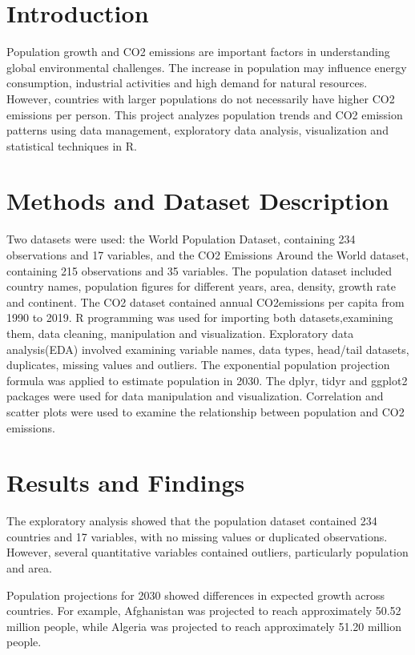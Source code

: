\documentclass[10pt,a4paper]{article}
\begin{document}
\section{Introduction}

Population growth and CO2 emissions are important factors in understanding global environmental challenges. The increase in population may influence energy consumption, industrial activities and high demand for natural resources. However, countries with larger populations do not necessarily have higher CO2 emissions per person. This project analyzes population trends and CO2 emission patterns using data management, exploratory data analysis, visualization and statistical techniques in R.


\section{Methods and Dataset Description}

Two datasets were used: the World Population Dataset, containing 234 observations and 17 variables, and the CO2 Emissions Around the World dataset, containing 215 observations and 35 variables. The population dataset included country names, population figures for different years, area, density, growth rate and continent. The CO2 dataset contained annual CO2emissions per capita from 1990 to 2019.
R programming was used for importing both datasets,examining them, data cleaning, manipulation and visualization. Exploratory data analysis(EDA) involved examining variable names, data types, head/tail datasets, duplicates, missing values and outliers. The exponential population projection formula was applied to estimate population in 2030. The dplyr, tidyr and ggplot2 packages were used for data manipulation and visualization. Correlation and scatter plots were used to examine the relationship between population and CO2 emissions.


\section{Results and Findings}

The exploratory analysis showed that the population
dataset contained 234 countries and 17 variables,
with no missing values or duplicated observations.
However, several quantitative variables contained
outliers, particularly population and area.

Population projections for 2030 showed differences
in expected growth across countries. For example,
Afghanistan was projected to reach approximately
50.52 million people, while Algeria was projected
to reach approximately 51.20 million people.
\end{document}
